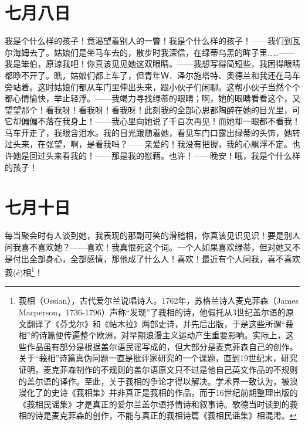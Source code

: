 \documentclass[12pt,oneside]{book}
\begin{document}
\chapter{七月八日}
\label{sec-2-17}
我是个什么样的孩子！竟渴望着别人的一瞥！我是个什么样的孩子！——我们到瓦尔海姆去了。姑娘们是坐马车去的，散步时我深信，在绿蒂乌黑的眸子里……——我是笨伯，原谅我吧！你真该见见她这双眼睛。——我想写得简短些，我困得眼睛都睁不开了。瞧，姑娘们都上车了，但青年Ｗ．泽尔施塔特、奥德兰和我还在马车旁站着。这时姑娘们都从车门里伸出头来，跟小伙子们闲聊。这帮小伙子当然个个都心情愉快，举止轻浮。——我竭力寻找绿蒂的眼睛；啊，她的眼睛看看这个，又望望那个！看我呀！看我呀！看我呀！此刻我的全部心思都陶醉在她的目光里，可它却偏偏不落在我身上！——我心里向她说了千百次再见！而她却一眼都不看我！马车开走了，我眼含泪水。我的目光跟随着她，看见车门口露出绿蒂的头饰，她转过头来，在张望，啊，是看我吗？——亲爱的！我没有把握，我的心飘浮不定。也许她是回过头来看我的！——那是我的慰藉。也许！——晚安！哦，我是个什么样的孩子！


\chapter{七月十日}
\label{sec-2-18}
每当聚会时有人谈到她，我表现的那副可笑的滑稽相，你真该见识见识！要是别人问我喜不喜欢她？——喜欢！我真恨死这个词。一个人如果喜欢绿蒂，但对她又不是付出全部身心，全部感情，那他成了什么人！喜欢！最近有个人问我，喜不喜欢莪(é)相\footnote{莪相（Ossian），古代爱尔兰说唱诗人。1762年，苏格兰诗人麦克菲森（James Macperson，1736-1796）声称“发现”了莪相的诗，他假托从3世纪盖尔语的原文翻译了《芬戈尔》和《帖木拉》两部史诗，并先后出版，于是这些所谓“莪相”的诗篇便传遍整个欧洲，对早期浪漫主义运动产生重要影响。实际上，这些作品虽有部分是根据盖尔语民谣写成的，但大部分是麦克菲森自己的创作。关于“莪相”诗篇真伪问题一直是批评家研究的一个课题，直到19世纪末，研究证明，麦克菲森制作的不规则的盖尔语原文只不过是他自己英文作品的不规则的盖尔语的译作。至此，关于莪相的争论才得以解决。学术界一致认为，被浪漫化了的史诗《莪相集》并非真正是莪相的作品，而于16世纪前期整理出版的《莪相民谣集》才是真正的爱尔兰盖尔语抒情诗和叙事诗。歌德当时读到的莪相的诗是麦克菲森的创作，不能与真正的莪相诗篇《莪相民谣集》相混淆。}！
\end{document}

